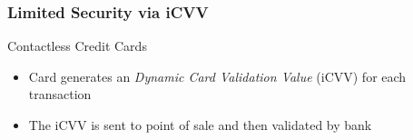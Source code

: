 \documentclass[unknownkeysallowed]{beamer}
\begin{document}
\begin{frame}
\frametitle{Limited Security via iCVV}
  \begin{center}
  \begin{minipage}{.9\textwidth}
  \begin{block}{Contactless Credit Cards}
    \begin{itemize}
      \item{Card generates an \textit{Dynamic Card Validation Value} (iCVV) for each transaction}
      \pause
      \item{The iCVV is sent to point of sale and then validated by bank}
    \end{itemize}
  \end{block}
  \end{minipage}
  \end{center}
\end{frame}
\end{document}
